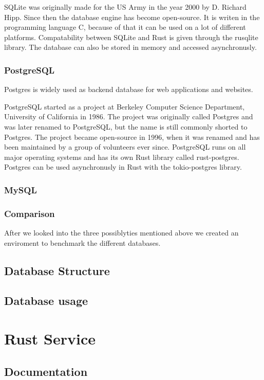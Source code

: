 SQLite was originally made for the US Army in the year 2000 by D. Richard Hipp. Since then the database engine has become open-source. It is writen in the programming language
C, because of that it can be used on a lot of different platforms. Compatability between SQLite and Rust is given through the rusqlite library. The database can also be stored
in memory and accessed asynchronusly. 

\subsubsection{PostgreSQL}
Postgres is widely used as backend database for web applications and websites. 

PostgreSQL started as a project at Berkeley Computer Science Department, University of California in 1986. The project was originally called Postgres and was later renamed to
PostgreSQL, but the name is still commonly shorted to Postgres. The project became open-source in 1996, when it was renamed and has been maintained by a group of volunteers 
ever since. PostgreSQL runs on all major operating systems and has its own Rust library called rust-postgres. Postgres can be used asynchronusly in Rust with the tokio-postgres 
library.  

\subsubsection{MySQL}


\subsubsection{Comparison}
After we looked into the three possiblyties mentioned above we created an enviroment to benchmark the different databases.

\subsection{Database Structure}


\subsection{Database usage}


\section{Rust Service}
\subsection{Documentation}

